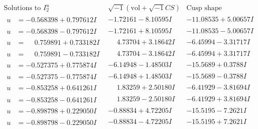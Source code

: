 \documentclass[1p]{elsarticle_modified}
\theoremstyle{definition}
\newcommand{\I}{\sqrt{-1}}
\begin{document}
$$\begin{array}{c|c|c}  
\text{Solutions to }I^u_{2}& \I (\text{vol} + \sqrt{-1}CS) & \text{Cusp shape}\\
 \hline 
\begin{aligned}
u &= -0.568398 + 0.797612 I\end{aligned}
 & -1.72161 - 8.10595 I & -11.08535 + 5.00657 I \\ \hline\begin{aligned}
u &= -0.568398 - 0.797612 I\end{aligned}
 & -1.72161 + 8.10595 I & -11.08535 - 5.00657 I \\ \hline\begin{aligned}
u &= \phantom{-}0.759891 + 0.733182 I\end{aligned}
 & \phantom{-}4.73704 + 3.18642 I & -6.45994 - 3.31717 I \\ \hline\begin{aligned}
u &= \phantom{-}0.759891 - 0.733182 I\end{aligned}
 & \phantom{-}4.73704 - 3.18642 I & -6.45994 + 3.31717 I \\ \hline\begin{aligned}
u &= -0.527375 + 0.775874 I\end{aligned}
 & -6.14948 - 1.48503 I & -15.5689 + 0.3788 I \\ \hline\begin{aligned}
u &= -0.527375 - 0.775874 I\end{aligned}
 & -6.14948 + 1.48503 I & -15.5689 - 0.3788 I \\ \hline\begin{aligned}
u &= -0.853258 + 0.641261 I\end{aligned}
 & \phantom{-}1.83259 + 2.50180 I & -6.41929 - 3.81694 I \\ \hline\begin{aligned}
u &= -0.853258 - 0.641261 I\end{aligned}
 & \phantom{-}1.83259 - 2.50180 I & -6.41929 + 3.81694 I \\ \hline\begin{aligned}
u &= -0.898798 + 0.229050 I\end{aligned}
 & -0.88834 + 4.72205 I & -15.5195 - 7.2621 I \\ \hline\begin{aligned}
u &= -0.898798 - 0.229050 I\end{aligned}
 & -0.88834 - 4.72205 I & -15.5195 + 7.2621 I \\ \hline\begin{aligned}

\end{aligned}
\end{array}$$
\end{document}
